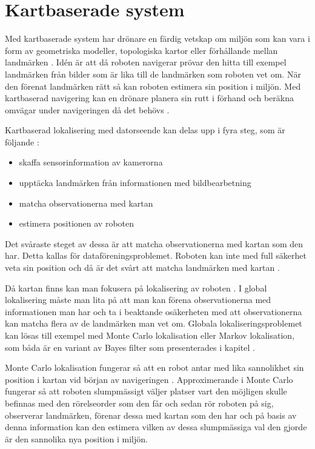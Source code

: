 \section{Kartbaserade system}

Med kartbaserade system har drönare en färdig vetskap om miljön som kan vara i form av geometriska modeller, topologiska kartor eller förhållande mellan landmärken \citep{982903}. Idén är att då roboten navigerar prövar den hitta till exempel landmärken från bilder som är lika till de landmärken som roboten vet om. När den förenat landmärken rätt så kan roboten estimera sin position i miljön. Med kartbaserad navigering kan en drönare planera sin rutt i förhand och beräkna omvägar under navigeringen då det behövs \citep{geospatial}. 

Kartbaserad lokalisering med datorseende kan delas upp i fyra steg, som är följande \citep{982903}:

\begin{itemize}
    \item skaffa sensorinformation av kamerorna
    \item upptäcka landmärken från informationen med bildbearbetning
    \item matcha observationerna med kartan
    \item estimera positionen av roboten
\end{itemize}

Det svåraste steget av dessa är att matcha observationerna med kartan som den har. Detta kallas för dataföreningsproblemet. Roboten kan inte med full säkerhet veta sin position och då är det svårt att matcha landmärken med kartan \citep{982903}.

Då kartan finns kan man fokusera på lokalisering av roboten \citep{982903}. I global lokalisering måste man lita på att man kan förena observationerna med informationen man har och ta i beaktande osäkerheten med att observationerna kan matcha flera av de landmärken man vet om. Globala lokaliseringsproblemet kan lösas till exempel med Monte Carlo lokalisation eller Markov lokalisation, som båda är en variant av Bayes filter som presenterades i kapitel  \citep{ProbabilisticRobotics}. 

Monte Carlo lokalisation fungerar så att en robot antar med lika sannolikhet sin position i kartan vid början av navigeringen \citep{montecarlo}. Approximerande i Monte Carlo fungerar så att roboten slumpmässigt väljer platser vart den möjligen skulle befinnas med den rörelseorder som den får och sedan rör roboten på sig, observerar landmärken, förenar dessa med kartan som den har och på basis av denna information kan den estimera vilken av dessa slumpmässiga val den gjorde är den sannolika nya position i miljön. 


